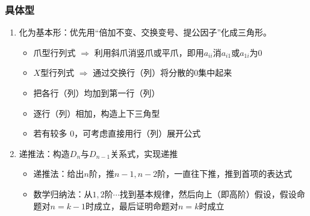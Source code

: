 \documentclass[./linear_algebra.tex]{subfiles}
\begin{document}
    \subsubsection{具体型}
    \begin{enumerate}
        \item 化为基本形：优先用“倍加不变、交换变号、提公因子”化成三角形。
        \begin{itemize}
            \item 爪型行列式 $\Rightarrow$ 利用斜爪消竖爪或平爪，即用$a_{ii}$消$a_{i1}$或$a_{1i}$为0
            \item $X$型行列式 $\Rightarrow$ 通过交换行（列）将分散的$0$集中起来
            \item 把各行（列）均加到第一行（列）
            \item 逐行（列）相加，构造上下三角型
            \item 若有较多 0，可考虑直接用行（列）展开公式
        \end{itemize}
        \item 递推法：构造$D_n$与$D_{n-1}$关系式，实现递推
        \begin{itemize}
            \item 递推法：给出$n$阶，推$n-1, n-2$阶，一直往下推，推到首项的表达式
            \item 数学归纳法：从$1, 2$阶$\cdots$找到基本规律，然后向上（即高阶）假设，假设命题对$n = k - 1$时成立，最后证明命题对$n = k$时成立
\end{itemize}
\end{enumerate}
\end{document}
